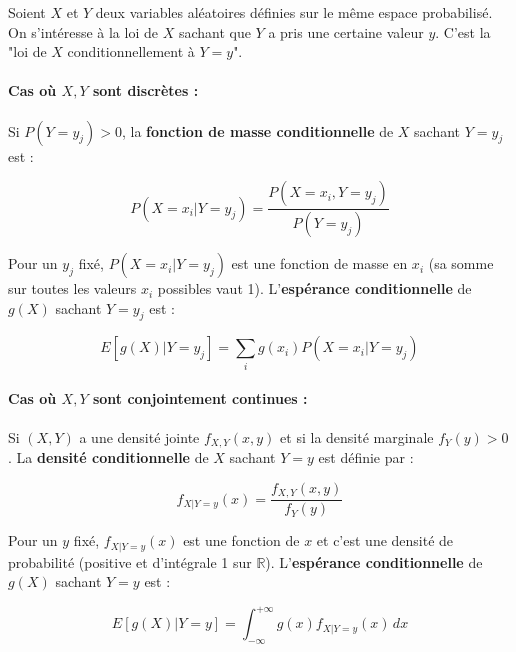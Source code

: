 Soient $X$ et $Y$ deux variables aléatoires définies sur le même espace probabilisé. On s'intéresse à la loi de $X$ sachant que $Y$ a pris une certaine valeur $y$. C'est la "loi de $X$ conditionnellement à $Y=y$".

\paragraph{Cas où $X, Y$ sont discrètes :} Si $P(Y=y_j) > 0$, la \textbf{fonction de masse conditionnelle} de $X$ sachant $Y=y_j$ est :

$$P(X=x_i | Y=y_j) = \frac{P(X=x_i, Y=y_j)}{P(Y=y_j)}$$

Pour un $y_j$ fixé, $P(X=x_i | Y=y_j)$ est une fonction de masse en $x_i$ (sa somme sur toutes les valeurs $x_i$ possibles vaut 1). L'\textbf{espérance conditionnelle} de $g(X)$ sachant $Y=y_j$ est :

$$E[g(X) | Y=y_j] = \sum_{i} g(x_i) P(X=x_i | Y=y_j)$$

\paragraph{Cas où $X, Y$ sont conjointement continues :} Si $(X, Y)$ a une densité jointe $f_{X,Y}(x,y)$ et si la densité marginale $f_Y(y) > 0$. La \textbf{densité conditionnelle} de $X$ sachant $Y=y$ est définie par :

$$f_{X|Y=y}(x) = \frac{f_{X,Y}(x,y)}{f_Y(y)}$$

Pour un $y$ fixé, $f_{X|Y=y}(x)$ est une fonction de $x$ et c'est une densité de probabilité (positive et d'intégrale 1 sur $\mathbb{R}$). L'\textbf{espérance conditionnelle} de $g(X)$ sachant $Y=y$ est :

$$E[g(X) | Y=y] = \int_{-\infty}^{+\infty} g(x) f_{X|Y=y}(x) \, dx$$

\vspace{1em}

